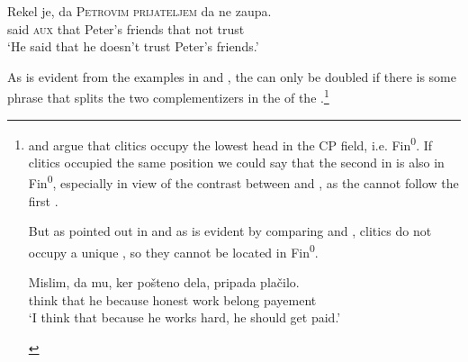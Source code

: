 \documentclass[output=paper,colorlinks,citecolor=brown]{langsci/langscibook}
\begin{document}
\begin{exe}
\ex \label{ex:plesnicar:two}
\gll Rekel	je,	da	\textsc{Petrovim}	\textsc{prijateljem}	da	ne	zaupa. \\
	said	\textsc{aux}	that	Peter’s		friends	that	not	trust\\
\trans `He said that he doesn’t trust Peter’s friends.'
\end{exe}

\noindent\largerpage
As is evident from the examples in  and , the  can only be doubled if there is some phrase that splits the two complementizers in the  of the .\footnote{\cite{lenertova2001} and \cite{Veselovská2008} argue that   clitics occupy the lowest head in the CP field, i.e. Fin\textsuperscript{0}. If  clitics occupied the same position we could say that the second  in  is also in Fin\textsuperscript{0}, especially in view of the contrast between  and , as the  cannot follow the first .

\z

\noindent But as pointed out in \cite{marusic2008} and as is evident by comparing  and ,  clitics do not occupy a unique , so they cannot be located in Fin\textsuperscript{0}.

\begin{exe}
\ex \label{ex:plesnicar:embtwo}
\gll Mislim, 	da 	mu, 	ker 	pošteno 	dela, 	pripada 	plačilo. \\
	think	that	he	because	honest	work	belong	payement\\
\trans `I think that because he works hard, he should get paid.'
\end{exe}

}
\end{document}
